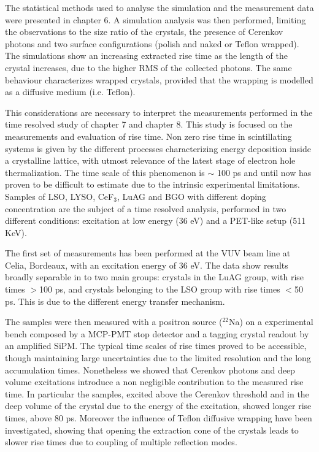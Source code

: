 The statistical methods used to analyse the simulation and the measurement data were presented in chapter 6.
A simulation analysis was then performed, limiting the observations to the size ratio of the crystals, the presence of Cerenkov photons and two surface configurations (polish and naked or Teflon wrapped).
The simulations show an increasing extracted rise time as the length of the crystal increases, due to the higher RMS of the collected photons. The same behaviour characterizes wrapped crystals, provided that the wrapping is modelled as a diffusive medium (i.e. Teflon).

This considerations are necessary to interpret the measurements performed in the time resolved study of chapter 7 and chapter 8.
This study is focused on the measurements and evaluation of rise time. Non zero rise time in scintillating systems is given by the different processes characterizing energy deposition inside a crystalline lattice, with utmost relevance of the latest stage of electron hole thermalization. The time scale of this phenomenon is $\sim$ 100 ps and until now has proven to be difficult to estimate due to the intrinsic experimental limitations.
Samples of LSO, LYSO, CeF$_{3}$, LuAG and BGO with different doping concentration are the subject of a time resolved analysis, performed in two different conditions: excitation at low energy (36 eV) and a PET-like setup (511 KeV).

The first set of measurements has been performed at the VUV beam line at Celia, Bordeaux, with an excitation energy of 36 eV. 
The data show results broadly separable in to two main groups: crystals in the LuAG group, with rise times $>$100 ps, and crystals belonging to the LSO group with rise times $<$50 ps. This is due to the different energy transfer mechanism.

The samples were then measured with a positron source ($^{22}$Na) on a experimental bench composed by a MCP-PMT stop detector and a tagging crystal readout by an amplified SiPM.
The typical time scales of rise times proved to be accessible, though maintaining large uncertainties due to the limited resolution and the long accumulation times.
Nonetheless we showed that Cerenkov photons and deep volume excitations introduce a non negligible contribution to the measured rise time. In particular the samples, excited above the Cerenkov threshold and in the deep volume of the crystal due to the energy of the excitation, showed longer rise times, above 80 ps.
Moreover the influence of Teflon diffusive wrapping have been investigated, showing that opening the extraction cone of the crystals leads to slower rise times due to coupling of multiple reflection modes.

